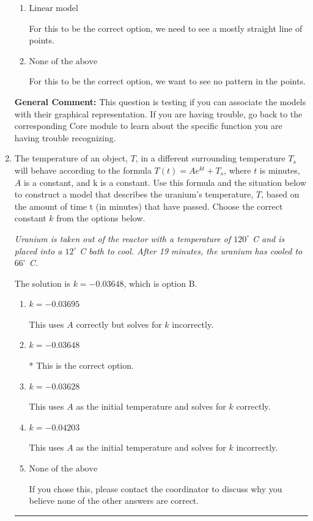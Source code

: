 \documentclass{extbook}[14pt]
\newcommand{\litem}[1]{\item #1

\rule{\textwidth}{0.4pt}}
\begin{document}
\begin{enumerate}
{\begin{enumerate}[label=\Alph*.]
For this to be the correct option, we want an extremely slow change early, then a rapid change later.
\item \( \text{Linear model} \)

For this to be the correct option, we need to see a mostly straight line of points.
\item \( \text{None of the above} \)

For this to be the correct option, we want to see no pattern in the points.
\end{enumerate}

\textbf{General Comment:} This question is testing if you can associate the models with their graphical representation. If you are having trouble, go back to the corresponding Core module to learn about the specific function you are having trouble recognizing.
}
\litem{
The temperature of an object, $T$, in a different surrounding temperature $T_s$ will behave according to the formula $T(t) = Ae^{kt} + T_s$, where $t$ is minutes, $A$ is a constant, and k is a constant. Use this formula and the situation below to construct a model that describes the uranium's temperature, $T$, based on the amount of time t (in minutes) that have passed. Choose the correct constant $k$ from the options below.

\begin{center}
    \textit{ Uranium is taken out of the reactor with a temperature of $120^{\circ}$ C and is placed into a $12^{\circ}$ C bath to cool. After 19 minutes, the uranium has cooled to $66^{\circ}$ C. }
\end{center}


The solution is \( k = -0.03648 \), which is option B.\begin{enumerate}[label=\Alph*.]
\item \( k = -0.03695 \)

This uses $A$ correctly but solves for $k$ incorrectly.
\item \( k = -0.03648 \)

* This is the correct option.
\item \( k = -0.03628 \)

This uses $A$ as the initial temperature and solves for $k$ correctly.
\item \( k = -0.04203 \)

This uses $A$ as the initial temperature and solves for $k$ incorrectly.
\item \( \text{None of the above} \)

If you chose this, please contact the coordinator to discuss why you believe none of the other answers are correct.
\end{enumerate}

}
\end{enumerate}
\end{document}
